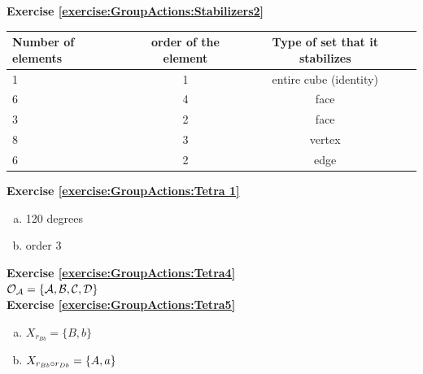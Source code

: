 \noindent\textbf{Exercise \ref{exercise:GroupActions:Stabilizers2}}
\begin{center}
\begin{tabular}{ |l |c|c| r |}\hline
  Number of elements & order of the element & Type of set that it stabilizes \\ \hline
  1 & 1 & entire cube (identity) \\ \hline
  6 & 4 & face \\ \hline
 3 & 2 & face \\ \hline
8 & 3& vertex \\ \hline
6& 2 & edge \\ \hline
\end{tabular}
\end{center}

\noindent\textbf{Exercise \ref{exercise:GroupActions:Tetra 1}}
\begin{enumerate}[(a)]
\item 
120 degrees
\item 
order 3
\end{enumerate}

\noindent\textbf{Exercise \ref{exercise:GroupActions:Tetra4}}
\\
$ \cal{O}_A =\{A,B,C,D\}$
\\

\noindent\textbf{Exercise \ref{exercise:GroupActions:Tetra5}}
\begin{enumerate}[(a)]
\item
$X_{r_{Bb}}=\{B,b\}$

\item 
$X_{ r_{Bb}\circ r_{Db }}=\{A,a\}$

\end{enumerate}

